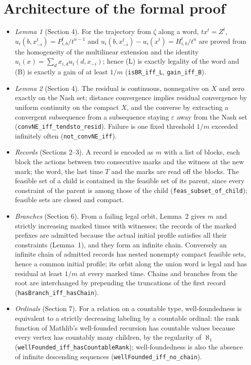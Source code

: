 \documentclass[11pt]{article}
\theoremstyle{definition}
\begin{document}
\section{Architecture of the formal proof}

\begin{itemize}
\item \emph{Lemma 1} (Section 4). For the trajectory from $\zeta$ along a word, $tx^t=Z^t$, $u_i(b,x^t_{-i})=P^t_{i,b}/t^{n-1}$ and $u_i(b,x^t_{-i})-u_i(x^t)=H^t_{i,b}/t^n$ are proved from the homogeneity of the multilinear extension and the identity $u_i(x)=\sum_dx_{i,d}u_i(d,x_{-i})$; hence (L) is exactly legality of the word and (B) is exactly a gain of at least $1/m$ (\texttt{isBR\_iff\_L}, \texttt{gain\_iff\_B}).
\item \emph{Lemma 2} (Section 4). The residual is continuous, nonnegative on $X$ and zero exactly on the Nash set; distance convergence implies residual convergence by uniform continuity on the compact $X$, and the converse by extracting a convergent subsequence from a subsequence staying $\varepsilon$ away from the Nash set (\texttt{convNE\_iff\_tendsto\_resid}). Failure is one fixed threshold $1/m$ exceeded infinitely often (\texttt{not\_convNE\_iff}).
\item \emph{Records} (Sections 2--3). A record is encoded as $m$ with a list of blocks, each block the actions between two consecutive marks and the witness at the new mark; the word, the last time $T$ and the marks are read off the blocks. The feasible set of a child is contained in the feasible set of its parent, since every constraint of the parent is among those of the child (\texttt{feas\_subset\_of\_child}); feasible sets are closed and compact.
\item \emph{Branches} (Section 6). From a failing legal orbit, Lemma~2 gives $m$ and strictly increasing marked times with witnesses; the records of the marked prefixes are admitted because the actual initial profile satisfies all their constraints (Lemma~1), and they form an infinite chain. Conversely an infinite chain of admitted records has nested nonempty compact feasible sets, hence a common initial profile; its orbit along the union word is legal and has residual at least $1/m$ at every marked time. Chains and branches from the root are interchanged by prepending the truncations of the first record (\texttt{hasBranch\_iff\_hasChain}).
\item \emph{Ordinals} (Section 7). For a relation on a countable type, well-foundedness is equivalent to a strictly decreasing labeling by a countable ordinal: the rank function of Mathlib's well-founded recursion has countable values because every vertex has countably many children, by the regularity of $\aleph_1$ (\texttt{wellFounded\_iff\_hasCountableRank}); well-foundedness is also the absence of infinite descending sequences (\texttt{wellFounded\_iff\_no\_chain}).

\end{itemize}
\end{document}
